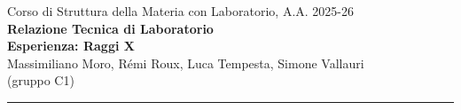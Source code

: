 \documentclass[a4paper,12pt]{article}
\begin{document}
\begin{center}

\small{Corso di Struttura della Materia con Laboratorio, A.A. 2025-26} \\
\vspace{0.4cm}
\small{\textbf{Relazione Tecnica di Laboratorio}}\\
\vspace{0.4cm}
\LARGE{\textbf{Esperienza: Raggi X}}
\vspace{0.4cm} \\
\normalsize{Massimiliano Moro, Rémi Roux, Luca Tempesta, Simone Vallauri} \\
\vspace{0.1cm}
\small (gruppo C1) \\

\vspace{0.1cm}
\medskip
\normalsize
\end{center}
\vspace{0.4cm}
{\color{gray}\hrule}
\medskip

\begin{abstract}
\noindent 
\end{abstract}

\tableofcontents
\clearpage

\pagestyle{fancy}
\fancyhead{} %













\clearpage

\appendix

\clearpage




\end{document}
